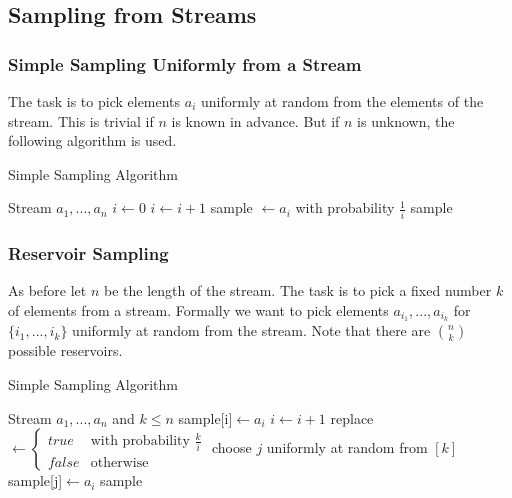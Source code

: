 \documentclass[english]{panikzettel}
\begin{document}
\subsection{Sampling from Streams}
\subsubsection{Simple Sampling Uniformly from a Stream}
The task is to pick elements $a_i$ uniformly at random from the elements of the stream. This is trivial if $n$ is known in advance. But if $n$ is unknown, the following algorithm is used.

\begin{algo}{Simple Sampling Algorithm}
{
\renewcommand{\algorithmicrequire}{\textbf{Input:}}
\renewcommand{\algorithmicensure}{\textbf{Output:}}
  \begin{algorithmic}[1]
  \Require Stream $a_1,...,a_n$ 
  \State $i\leftarrow 0$
    \State $i\leftarrow i+1$
    \State sample $\leftarrow a_i$ with probability $\frac{1}{i}$ 
  \EndWhile
  \State \Return sample
  \end{algorithmic}
}
\end{algo}

\subsubsection{Reservoir Sampling}
As before let $n$ be the length of the stream. The task is to pick a fixed number $k$ of elements from a stream. Formally we want to pick elements $a_{i_1},...,a_{i_k}$ for $\{i_1,...,i_k\}$ uniformly at random from the stream.
Note that there are $\binom{n}{k}$ possible reservoirs.

\begin{algo}{Simple Sampling Algorithm}
{
\renewcommand{\algorithmicrequire}{\textbf{Input:}}
\renewcommand{\algorithmicensure}{\textbf{Output:}}
  \begin{algorithmic}[1]
  \Require Stream $a_1,...,a_n$ and $k\leq n$
  \State sample[i]$\leftarrow a_i$ 
  \EndFor
    \State $i\leftarrow i+1$
    \State replace $\leftarrow\begin{cases}
    true & \text{with probability } \frac{k}{i}\\
    false & \text{otherwise}
    \end{cases}$
    \State choose $j$ uniformly at random from $[k]$
    \State sample[j]$\leftarrow a_i$
    \EndIf
  \EndWhile
  \State \Return sample
  \end{algorithmic}
}
\end{algo}
\end{document}
